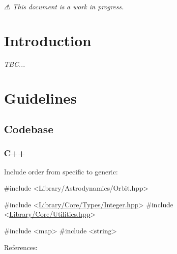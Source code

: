 {\itshape ⚠ This document is a work in progress.}\hypertarget{md__c_o_n_t_r_i_b_u_t_i_n_g_Introduction}{}\section{Introduction}\label{md__c_o_n_t_r_i_b_u_t_i_n_g_Introduction}
{\itshape T\+BC...}\hypertarget{md__c_o_n_t_r_i_b_u_t_i_n_g_Guidelines}{}\section{Guidelines}\label{md__c_o_n_t_r_i_b_u_t_i_n_g_Guidelines}
\hypertarget{md__c_o_n_t_r_i_b_u_t_i_n_g_Codebase}{}\subsection{Codebase}\label{md__c_o_n_t_r_i_b_u_t_i_n_g_Codebase}
\hypertarget{md__c_o_n_t_r_i_b_u_t_i_n_g_C}{}\subsubsection{C++}\label{md__c_o_n_t_r_i_b_u_t_i_n_g_C}
Include order from specific to generic\+:


\begin{DoxyCode}
\textcolor{preprocessor}{#include <Library/Astrodynamics/Orbit.hpp>}

\textcolor{preprocessor}{#include <\hyperlink{_integer_8hpp}{Library/Core/Types/Integer.hpp}>}
\textcolor{preprocessor}{#include <\hyperlink{_utilities_8hpp}{Library/Core/Utilities.hpp}>}

\textcolor{preprocessor}{#include <map>}
\textcolor{preprocessor}{#include <string>}
\end{DoxyCode}


References\+:



